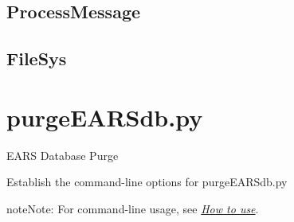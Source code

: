 \documentclass[letterpaper,10pt,english]{sphinxmanual}
\begin{document}
\subsection{ProcessMessage}
\label{codedocs/EARSmilter:processmessage}\label{codedocs/EARSmilter:id3}

\begin{fulllineitems}
\label{codedocs/EARSmilter:EARSmilter.EARSmilter.ProcessMessage}
\end{fulllineitems}



\subsection{FileSys}
\label{codedocs/EARSmilter:id4}\label{codedocs/EARSmilter:filesys}

\begin{fulllineitems}
\label{codedocs/EARSmilter:EARSmilter.EARSmilter.FileSys}
\end{fulllineitems}



\section{purgeEARSdb.py}
\label{codedocs/purgeEARSdb_py:purgeearsdb-py}\label{codedocs/purgeEARSdb_py::doc}\label{codedocs/purgeEARSdb_py:module-purgeEARSdb}
EARS Database Purge

\begin{fulllineitems}
\label{codedocs/purgeEARSdb_py:purgeEARSdb.purgeEARSdb.Options}
Establish the command-line options for purgeEARSdb.py

\begin{notice}{note}{Note:}
For command-line usage, see {\hyperref[codedocs/purgeEARSdb_py:how-to-use]{\emph{How to use}}}.
\end{notice}

\end{fulllineitems}
\end{document}
